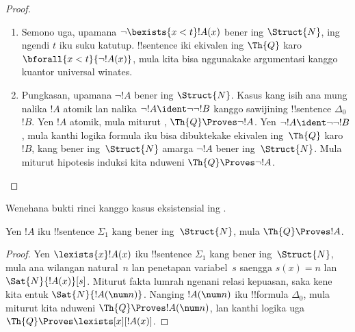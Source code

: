 \documentclass[../../../include/open-logic-section]{subfiles}
\begin{document}
\begin{proof}
\begin{enumerate}
diturunake ing~$\Th{Q}$, mula kita bisa nggunakake
argumentasi kanggo kuantor eksistensial winates.
%
\item Semono uga, upamana $\lnot \bexists{x<t}!A(x)$
bener ing $\Struct{N}$, ing ngendi $t$ iku suku katutup.
!!{sentence} iki ekivalen ing $\Th{Q}$ karo
$\bforall{x<t}{\lnot!A(x)}$, mula kita bisa nggunakake
argumentasi kanggo kuantor universal winates.
%
\item Pungkasan, upamana $\lnot !A$ bener ing $\Struct{N}$.
Kasus kang isih ana mung nalika $!A$ atomik lan nalika
$\lnot !A \ident \lnot\lnot !B$ kanggo sawijining
!!{sentence} $\Delta_0$ $!B$. Yen $!A$ atomik, mula miturut
, $\Th{Q} \Proves \lnot !A$.
Yen $\lnot !A \ident \lnot\lnot !B$, mula kanthi logika
formula iku bisa dibuktekake ekivalen ing~$\Th{Q}$ karo~$!B$,
kang bener ing~$\Struct{N}$ amarga $\lnot !A$ bener
ing~$\Struct{N}$. Mula miturut hipotesis induksi kita nduweni
$\Th{Q} \Proves \lnot !A$.
\end{enumerate}
\end{proof}

\begin{prob}
Wenehana bukti rinci kanggo kasus eksistensial ing
.
\end{prob}

\begin{thm}
Yen $!A$ iku !!{sentence} $\Sigma_1$ kang bener
ing~$\Struct{N}$, mula $\Th{Q} \Proves !A$.
\end{thm}

\begin{proof}
Yen $\lexists{x}!A(x)$ iku !!{sentence} $\Sigma_1$
kang bener ing~$\Struct{N}$, mula ana wilangan natural~$n$
lan penetapan variabel~$s$ saengga $s(x) = n$ lan
$\Sat{N}{!A(x)}[s]$. Miturut fakta lumrah ngenani
relasi kepuasan, saka kene kita entuk $\Sat{N}{!A(\num n)}$.
Nanging $!A(\num n)$ iku !!{formula} $\Delta_0$, mula
miturut  kita nduweni
$\Th{Q} \Proves !A(\num n)$, lan kanthi logika uga
$\Th{Q} \Proves \lexists[x][!A(x)]$.
\end{proof}
\end{document}
